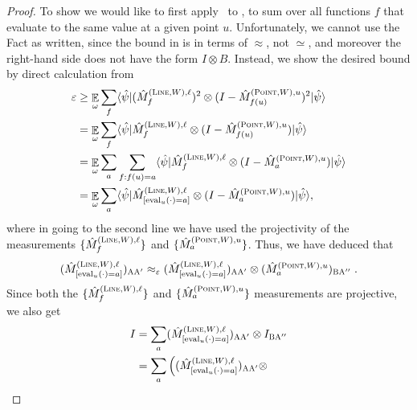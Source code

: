 \documentclass[11pt]{article}
\theoremstyle{definition}
\newcommand{\ket}[1]{|#1\rangle}
\newcommand{\bra}[1]{\langle#1|}
\newcommand{\Id}{\ensuremath{I}}
\newcommand{\ot}{\otimes}
\newcommand{\eps}{\varepsilon}
\newcommand{\E}{\mathop{\mathbb{E}}\displaylimits}
\newcommand{\labelstyle}[1]{\ensuremath{\textsc{#1}}\xspace}
\newcommand{\alice}{\labelstyle{A}}
\newcommand{\bob}{\labelstyle{B}}
\newcommand{\typestyle}[1]{\ensuremath{\textsc{#1}}\xspace}
\renewcommand{\line}{\mathbf{\ell}}
\newcommand{\Point}{\typestyle{Point}}
\newcommand{\Line}{\typestyle{Line}}
\newcommand{\eval}{\mathrm{eval}}
\begin{document}
\begin{proof}
To show  we would like to first
apply~ to ,
to sum over all functions $f$ that evaluate to the same value at a given
point $u$. Unfortunately, we cannot use the Fact as written, since the
bound in  is in terms of $\approx$, not
$\simeq$, and moreover the right-hand side does not have the form $I
\ot B$. Instead, we show the desired bound by direct calculation from 
\begin{align}
  \eps &\geq \E_{\omega} \sum_{f} \bra{\hat{\psi}} (\hat{M}^{(\Line, W),
  \line}_f )^2 \ot (I - \hat{M}^{(\Point, W), u}_{f(u)})^2 \ket{\hat{\psi}}
  \\
                 &= \E_{\omega} \sum_{f} \bra{\hat{\psi}} \hat{M}^{(\Line, W),
                   \line}_f  \ot (I - \hat{M}^{(\Point, W), u}_{f(u)})
                   \ket{\hat{\psi}} \\
                 &= \E_{\omega} \sum_{a} \sum_{f: f(u) = a} \bra{\hat{\psi}} \hat{M}^{(\Line, W),
                   \line}_f  \ot (I - \hat{M}^{(\Point, W), u}_{a})
                   \ket{\hat{\psi}} \\
                 &=\E_{\omega} \sum_{a}  \bra{\hat{\psi}} \hat{M}^{(\Line, W),
                   \line}_{[\eval_u(\cdot) = a]}  \ot (I - \hat{M}^{(\Point, W), u}_{a})
                   \ket{\hat{\psi}},
\end{align}
where in going to the second line we have used the projectivity of the
measurements $\{\hat{M}^{(\Line, W), \line}_f\}$ and
$\{\hat{M}^{(\Point, W), u}_{a}\}$.
Thus, we have deduced that
\begin{equation}
\label{eq:qld-comm-line-1}
(\hat{M}^{(\Line,W),\line}_{[\eval_u(\cdot) = a]})_{\alice \alice'} \approx_\eps (\hat{M}^{(\Line,W),\line}_{[\eval_u(\cdot) = a]})_{\alice \alice'} \otimes (\hat{M}^{(\Point,W),u}_{a})_{\bob \alice''}\;.
\end{equation}
Since both the $\{ \hat{M}^{(\Line,W),\line}_f\}$ and $\{ \hat{M}^{(\Point,W),u}_a \}$ measurements are projective, we also get 
\begin{align}
\Id &= \sum_a (\hat{M}^{(\Line,W),\line}_{[\eval_u(\cdot) =
      a]})_{\alice \alice'} \otimes I_{\bob \alice''}\notag\\
&= \sum_a \Big((\hat{M}^{(\Line,W),\line}_{[\eval_u(\cdot) =
                                                               a]})_{\alice
                                                               \alice'}
                                                               \ot

\end{align}
\end{proof}
\end{document}
